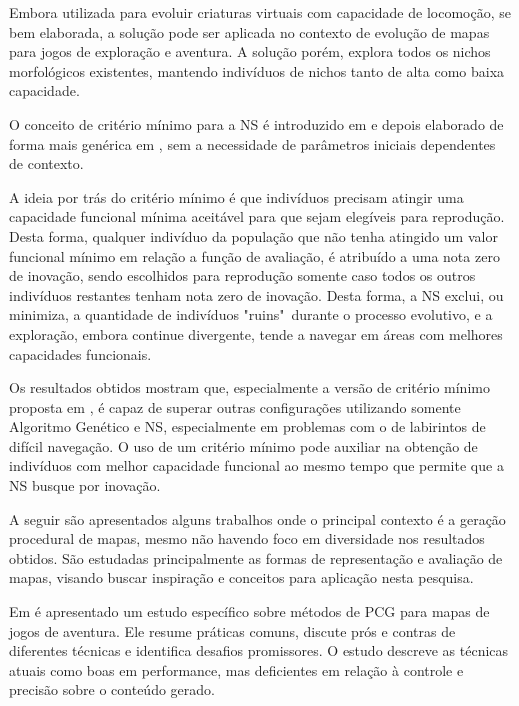 Embora utilizada para evoluir criaturas virtuais com capacidade de locomoção, se bem elaborada, a solução pode ser aplicada no contexto de evolução de mapas para jogos de exploração e aventura. A solução porém, explora todos os nichos morfológicos existentes, mantendo indivíduos de nichos tanto de alta como baixa capacidade.

O conceito de critério mínimo para a NS é introduzido em \cite{lehman2010revising} e depois elaborado de forma mais genérica em  \cite{gomes2012progressive}, sem a necessidade de parâmetros iniciais dependentes de contexto.

A ideia por trás do critério mínimo é que indivíduos precisam atingir uma capacidade funcional mínima aceitável para que sejam elegíveis para reprodução. Desta forma, qualquer indivíduo da população que não tenha atingido um valor funcional mínimo em relação a função de avaliação, é atribuído a uma nota zero de inovação, sendo escolhidos para reprodução somente caso todos os outros indivíduos restantes tenham nota zero de inovação. Desta forma, a NS exclui, ou minimiza, a quantidade de indivíduos "ruins"~durante o processo evolutivo, e a exploração, embora continue divergente, tende a navegar em áreas com melhores capacidades funcionais.

Os resultados obtidos mostram que, especialmente a versão de critério mínimo proposta em \cite{gomes2012progressive}, é capaz de superar outras configurações utilizando somente Algoritmo Genético e NS, especialmente em problemas com o de labirintos de difícil navegação. O uso de um critério mínimo pode auxiliar na obtenção de indivíduos com melhor capacidade funcional ao mesmo tempo que permite que a NS busque por inovação.

A seguir são apresentados alguns trabalhos onde o principal contexto é a geração procedural de mapas, mesmo não havendo foco em diversidade nos resultados obtidos. São estudadas principalmente as formas de representação e avaliação de mapas, visando buscar inspiração e conceitos para aplicação nesta pesquisa.

Em \cite{van2014procedural} é apresentado um estudo específico sobre métodos de PCG para mapas de jogos de aventura. Ele resume práticas comuns, discute prós e contras de diferentes técnicas e identifica desafios promissores. O estudo descreve as técnicas atuais como boas em performance, mas deficientes em relação à controle e precisão sobre o conteúdo gerado.

